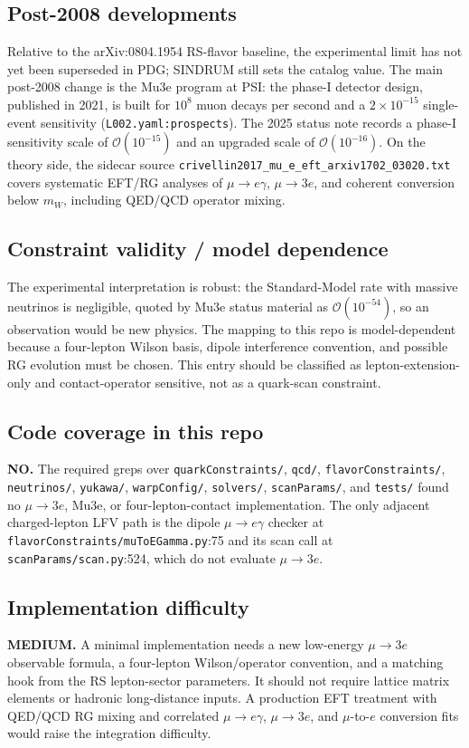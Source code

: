 \subsection*{Post-2008 developments}
Relative to the arXiv:0804.1954 RS-flavor baseline, the experimental limit has
not yet been superseded in PDG; SINDRUM still sets the catalog value.  The main
post-2008 change is the Mu3e program at PSI: the phase-I detector design,
published in 2021, is built for \(10^8\) muon decays per second and a
\(2\times10^{-15}\) single-event sensitivity
(\texttt{L002.yaml:prospects}).  The 2025 status note records a phase-I
sensitivity scale of \(\mathcal{O}(10^{-15})\) and an upgraded scale of
\(\mathcal{O}(10^{-16})\).  On the theory side, the sidecar source
\texttt{crivellin2017\_mu\_e\_eft\_arxiv1702\_03020.txt} covers systematic
EFT/RG analyses of \(\mu\to e\gamma\), \(\mu\to 3e\), and coherent conversion
below \(m_W\), including QED/QCD operator mixing.

\subsection*{Constraint validity / model dependence}
The experimental interpretation is robust: the Standard-Model rate with massive
neutrinos is negligible, quoted by Mu3e status material as
\(\mathcal{O}(10^{-54})\), so an observation would be new physics.  The mapping
to this repo is model-dependent because a four-lepton Wilson basis, dipole
interference convention, and possible RG evolution must be chosen.  This entry
should be classified as lepton-extension-only and contact-operator sensitive,
not as a quark-scan constraint.

\subsection*{Code coverage in this repo}
\textbf{NO.}  The required greps over \texttt{quarkConstraints/}, \texttt{qcd/},
\texttt{flavorConstraints/}, \texttt{neutrinos/}, \texttt{yukawa/},
\texttt{warpConfig/}, \texttt{solvers/}, \texttt{scanParams/}, and
\texttt{tests/} found no \(\mu\to 3e\), Mu3e, or four-lepton-contact
implementation.  The only adjacent charged-lepton LFV path is the dipole
\(\mu\to e\gamma\) checker at \texttt{flavorConstraints/muToEGamma.py}:75 and
its scan call at \texttt{scanParams/scan.py}:524, which do not evaluate
\(\mu\to 3e\).

\subsection*{Implementation difficulty}
\textbf{MEDIUM.}  A minimal implementation needs a new low-energy
\(\mu\to 3e\) observable formula, a four-lepton Wilson/operator convention, and
a matching hook from the RS lepton-sector parameters.  It should not require
lattice matrix elements or hadronic long-distance inputs.  A production EFT
treatment with QED/QCD RG mixing and correlated \(\mu\to e\gamma\),
\(\mu\to 3e\), and \(\mu\)-to-\(e\) conversion fits would raise the integration
difficulty.

